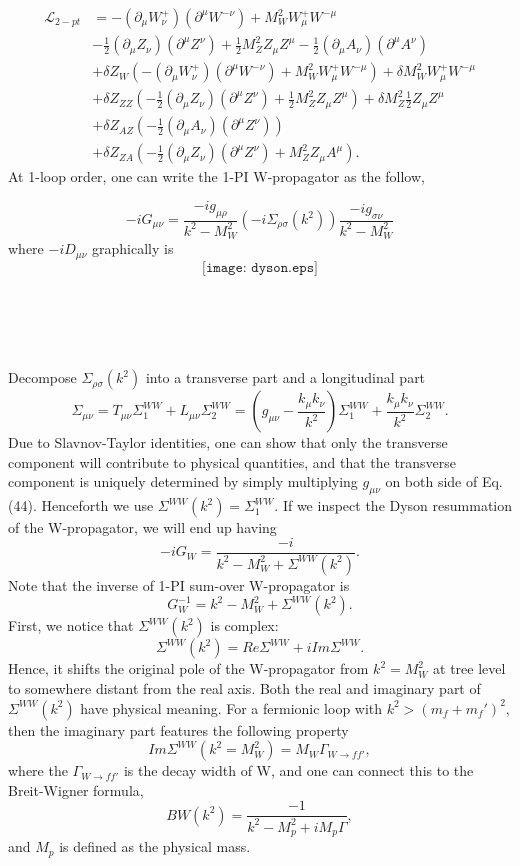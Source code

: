 \documentclass[secnumarabic, graphics,floatfix,nofootinbib,amsmath
tightenlines,nobibnotes,aps,prl,12pt]{revtex4-1}
\newcommand{\beeq}{\begin{equation}}
\newcommand{\eeeq}{\end{equation}}
\newcommand{\mn}{\mu\nu}
\begin{document}
\begin{equation}
\begin{split}
\mathcal{L}_{2-pt}&= -(\partial_{\mu}W^+_{\nu})(\partial^{\mu} W^{-\nu})+M_W^2W_\mu^+W^{-\mu}\\
                  &-\frac{1}{2} (\partial_{\mu}Z_{\nu})(\partial^{\mu} Z^{\nu})+ \frac{1}{2}M_Z^2Z_{\mu}Z^{\mu}-\frac{1}{2}(\partial_{\mu}A_{\nu})(\partial^{\mu} A^{\nu})\\
                  &+\delta Z_W (-(\partial_{\mu}W^+_{\nu})(\partial^{\mu} W^{-\nu})+M_W^2W_\mu^+W^{-\mu})+\delta M_W^2W_\mu^+W^{-\mu}\\
                  &+\delta Z_{ZZ}( -\frac{1}{2}(\partial_{\mu}Z_{\nu})(\partial^{\mu} Z^{\nu})+\frac{1}{2}M_Z^2Z_{\mu}Z^{\mu})+\delta M_Z^2 \frac{1}{2}Z_{\mu}Z^{\mu}\\
                  &+\delta Z_{AZ}( -\frac{1}{2}(\partial_{\mu}A_{\nu})(\partial^{\mu} Z^{\nu}))\\
                  &+\delta Z_{ZA}(-\frac{1}{2}(\partial_{\mu}Z_{\nu})(\partial^{\mu} Z^{\nu})+M_Z^2Z_{\mu}A^{\mu}).
                  \end{split}
\end{equation}
At 1-loop order, one can write the 1-PI W-propagator as the follow,



\beeq
-i G_{\mu\nu}=\frac{-i g_{\mu\rho}}{k^2-M_W^2}(-i \Sigma_{\rho\sigma}(k^2))\frac{-i g_{\sigma\nu}}{k^2-M_W^2}
\eeeq
where $-i D_{\mu\nu}$ graphically is 
\beeq
\texttt{[image: dyson.eps]}
\eeeq


\\
\\
\\
\\
Decompose $\Sigma_{\rho\sigma}(k^2)$ into a transverse part and a longitudinal part 
\beeq
\Sigma_{\mn}=T_{\mu\nu}\Sigma^{WW}_1+L_{\mu\nu}\Sigma^{WW}_2=(g_{\mu\nu}-\frac{k_{\mu}k_{\nu}}{k^2})\Sigma^{WW}_1+\frac{k_{\mu}k_{\nu}}{k^2}\Sigma^{WW}_2.
\eeeq
Due to Slavnov-Taylor identities\cite{Slavnov:1972fg}\cite{article}\cite{tHooft:1971akt}, one can show that only the transverse component will contribute to physical quantities, and that the transverse component is uniquely determined by simply multiplying $g_{\mn}$ on both side of Eq. (44). Henceforth we use $\Sigma^{WW}(k^2)=\Sigma^{WW}_1$.
If we inspect the Dyson resummation of the W-propagator, we will end up having 
\beeq
-i G_W=\frac{-i}{k^2-M_W^2+\Sigma^{WW}(k^2)}.
\eeeq
Note that the inverse of 1-PI sum-over W-propagator is
\beeq
G_{W}^{-1}=k^2-M_W^2+\Sigma^{WW}(k^2).
\eeeq
First, we notice that $\Sigma^{WW}(k^2)$ is complex:
\beeq
\Sigma^{WW}(k^2)=Re\Sigma^{WW}+i Im \Sigma^{WW}.
\eeeq
Hence, it shifts the original pole of the W-propagator from $k^2=M_W^2$ at tree level to somewhere distant from the real axis. Both the real and imaginary part of $\Sigma^{WW}(k^2)$ have physical meaning. For a fermionic loop with $k^2> (m_f+m_f')^2$, then the imaginary part features the following property
\beeq
Im \Sigma^{WW}(k^2=M_W^2)=M_W\Gamma_{W\to ff'},
\eeeq
where the $\Gamma_{W\to ff'}$ is the decay width of W, and one can connect this to the Breit-Wigner formula, 
\beeq
BW(k^2)=\frac{-1}{k^2-M_p^2+iM_p\Gamma},
\eeeq
and $M_p$ is defined as the physical mass.
\end{document}
